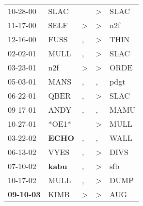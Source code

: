 \begin{supertabular}{p{0.07\textwidth}p{0.06\textwidth}p{0.02\textwidth}p{0.02\textwidth}p{0.06\textwidth}}
          10-28-00\textsuperscript{} &           SLAC\textsuperscript{} &               &     \textgreater &  SLAC\textsuperscript{} \\
          11-17-00\textsuperscript{} &           SELF\textsuperscript{} &  \textgreater &     \textgreater &   n2f\textsuperscript{} \\
          12-16-00\textsuperscript{} &           FUSS\textsuperscript{} &             , &     \textgreater &  THIN\textsuperscript{} \\
          02-02-01\textsuperscript{} &           MULL\textsuperscript{} &             , &     \textgreater &  SLAC\textsuperscript{} \\
          03-23-01\textsuperscript{} &            n2f\textsuperscript{} &  \textgreater &     \textgreater &  ORDE\textsuperscript{} \\
          05-03-01\textsuperscript{} &           MANS\textsuperscript{} &             , &                , &  pdgt\textsuperscript{} \\
          06-22-01\textsuperscript{} &           QBER\textsuperscript{} &             , &     \textgreater &  SLAC\textsuperscript{} \\
          09-17-01\textsuperscript{} &           ANDY\textsuperscript{} &             , &                , &  MAMU\textsuperscript{} \\
          10-27-01\textsuperscript{} &                            *OE1* &               &     \textgreater &  MULL\textsuperscript{} \\
          03-22-02\textsuperscript{} &  \textbf{ECHO\textsuperscript{}} &             , &                , &  WALL\textsuperscript{} \\
          06-13-02\textsuperscript{} &           VYES\textsuperscript{} &             , &     \textgreater &  DIVS\textsuperscript{} \\
          07-10-02\textsuperscript{} &  \textbf{kabu\textsuperscript{}} &             , &     \textgreater &   sfb\textsuperscript{} \\
          10-17-02\textsuperscript{} &           MULL\textsuperscript{} &             , &     \textgreater &  DUMP\textsuperscript{} \\
 \textbf{09-10-03\textsuperscript{}} &           KIMB\textsuperscript{} &  \textgreater &     \textgreater &   AUG\textsuperscript{} \\

\end{supertabular}
